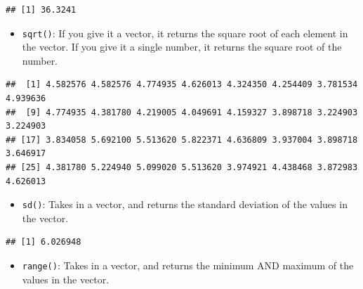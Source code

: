 \documentclass[
]{book}
\newenvironment{Shaded}{\begin{snugshade}}{\end{snugshade}}
\newcommand{\KeywordTok}[1]{\textcolor[rgb]{0.13,0.29,0.53}{\textbf{#1}}}
\newcommand{\NormalTok}[1]{#1}
\newcommand{\OperatorTok}[1]{\textcolor[rgb]{0.81,0.36,0.00}{\textbf{#1}}}
\providecommand{\tightlist}{%
  \setlength{\itemsep}{0pt}\setlength{\parskip}{0pt}}
\begin{document}
\begin{verbatim}
## [1] 36.3241
\end{verbatim}

\begin{itemize}
\tightlist
\item
  \texttt{sqrt()}: If you give it a vector, it returns the square root of each element in the vector. If you give it a single number, it returns the square root of the number.
\end{itemize}

\begin{Shaded}
\end{Shaded}

\begin{verbatim}
##  [1] 4.582576 4.582576 4.774935 4.626013 4.324350 4.254409 3.781534 4.939636
##  [9] 4.774935 4.381780 4.219005 4.049691 4.159327 3.898718 3.224903 3.224903
## [17] 3.834058 5.692100 5.513620 5.822371 4.636809 3.937004 3.898718 3.646917
## [25] 4.381780 5.224940 5.099020 5.513620 3.974921 4.438468 3.872983 4.626013
\end{verbatim}

\begin{itemize}
\tightlist
\item
  \texttt{sd()}: Takes in a vector, and returns the standard deviation of the values in the vector.
\end{itemize}

\begin{Shaded}
\end{Shaded}

\begin{verbatim}
## [1] 6.026948
\end{verbatim}

\begin{itemize}
\tightlist
\item
  \texttt{range()}: Takes in a vector, and returns the minimum AND maximum of the values in the vector.
\end{itemize}

\begin{Shaded}
\end{Shaded}
\end{document}
